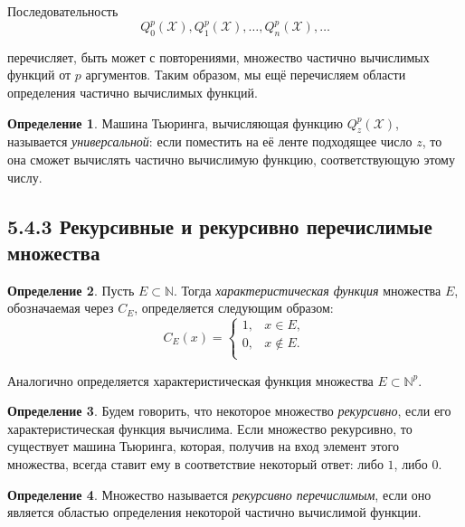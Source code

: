 \documentclass[a4paper, 12pt]{article}  %
\theoremstyle{definition}
\newtheorem*{theorem}{Теорема}
\newtheorem*{definition}{Определение}
\begin{document}
		Последовательность
		$$Q^p_0(\mathscr{X}), Q^p_1(\mathscr{X}), \dots, Q^p_n(\mathscr{X}), \dots$$
		
		перечисляет, быть может с повторениями, множество частично вычислимых функций от $p$ аргументов.
		Таким образом, мы ещё перечисляем области определения частично вычислимых функций.
		
		\begin{definition}
			Машина Тьюринга, вычисляющая функцию $Q^p_z(\mathscr{X})$, называется \textit{универсальной}:
			если поместить на её ленте подходящее число $z$, то она сможет вычислять частично вычислимую
			функцию, соответствующую этому числу.
		\end{definition}
		
		
		
		
	\subsection*{5.4.3 Рекурсивные и рекурсивно перечислимые множества}
	
		\begin{definition}
			Пусть $E \subset \mathbb{N}$. Тогда \textit{характеристическая функция} множества $E$, обозначаемая через $C_E$, определяется следующим образом:
			\[
				C_E(x) =  
					\begin{cases}
						1, & x \in E, \\
						0, & x \notin E. \\
					\end{cases}
			\]			
			
			Аналогично определяется характеристическая функция множества $E \subset \mathbb{N}^p$.
		\end{definition}
	
		\begin{definition}
			Будем говорить, что некоторое множество \textit{рекурсивно}, если его характеристическая
			функция вычислима. Если множество рекурсивно, то существует машина Тьюринга, которая, получив
			на вход элемент этого множества, всегда ставит ему в соответствие некоторый ответ: либо $1$,
			либо $0$.
		\end{definition}
	
		\begin{definition}
			Множество называется \textit{рекурсивно перечислимым}, если оно является областью определения
			некоторой частично вычислимой функции.
		\end{definition}
	
\end{document}
